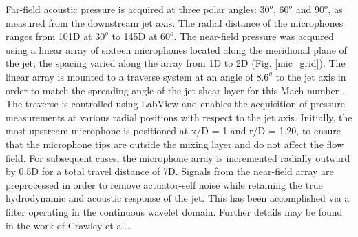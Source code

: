 \documentclass[english]{aiaa-tc}
\begin{document}
Far-field acoustic pressure is acquired at three polar angles: $30^{o}$, $60^{o}$ and $90^{o}$, as measured from the downstream jet axis. The radial distance of the microphones ranges from 101D at $30^{o}$ to 145D at $60^{o}$. The near-field pressure was acquired using a linear array of sixteen microphones located along the meridional plane of the jet; the spacing varied along the array from 1D to 2D (Fig. \ref{mic_grid}). The linear array is mounted to a traverse system at an angle of $8.6^{o}$ to the jet axis in order to match the spreading angle of the jet shear layer for this Mach number \cite{kfm2009-1}. The traverse is controlled using LabView and enables the acquisition of pressure measurements at various radial positions with respect to the jet axis. Initially, the most upstream microphone is positioned at x/D = 1 and r/D = 1.20, to ensure that the microphone tips are outside the mixing layer and do not affect the flow field. For subsequent cases, the microphone array is incremented radially outward by 0.5D for a total travel distance of 7D. Signals from the near-field array are preprocessed in order to remove actuator-self noise while retaining the true hydrodynamic and acoustic response of the jet. This has been accomplished via a filter operating in the continuous wavelet domain. Further details may be found in the work of Crawley et al.\cite{Crawley2015}.
\end{document}
